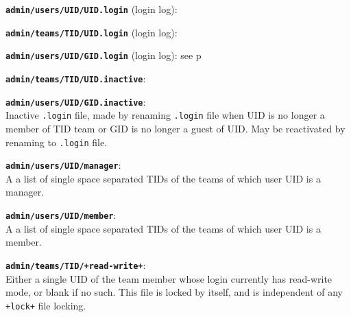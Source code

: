 \documentclass[12pt]{article}
\newenvironment{indpar}[1][0.4in]%
	{\begin{list}{}%
		     {\setlength{\itemsep}{0in}%
		      \setlength{\topsep}{0in}%
		      \setlength{\parsep}{1ex}%
		      \setlength{\labelwidth}{#1}%
		      \setlength{\leftmargin}{#1}%
		      \addtolength{\leftmargin}{\labelsep}}%
	 \item}%
	{\end{list}}
\newenvironment{itemlist}[1][0.2in]%
	{\begin{list}{}{\setlength{\labelwidth}{#1}%
		        \setlength{\leftmargin}{\labelwidth}%
		        \addtolength{\leftmargin}{+0.2in}%
		        \addtolength{\linewidth}{-\labelwidth}%
		        \addtolength{\linewidth}{-0.2in}%
		        \renewcommand{\makelabel}[1]{##1\hfill}}
	 \raggedright}%
	{\end{list}}
\newcommand{\TT}[1]{{\tt \bfseries #1}}
\newcommand{\pagref}[1]{p\pageref{#1}}
\begin{document}
\begin{indpar}
\begin{itemlist}
\item[\TT{admin/users/UID/UID.login} (login log):]
\item[\TT{admin/teams/TID/UID.login} (login log):]\vspace*{-1ex}
\item[\TT{admin/users/UID/GID.login} (login log):]\vspace*{-1ex}
see \pagref{ADMIN/USERS/XID/YID.LOGIN}

\item[\TT{admin/teams/TID/UID.inactive}:]
\item[\TT{admin/users/UID/GID.inactive}:]\vspace*{-1ex} ~
\label{ADMIN/USERS/XID/YID.INACTIVE} \\
Inactive {\tt .login} file, made by renaming {\tt .login} file
when UID is no longer a member of TID team or GID is no longer
a guest of UID.  May be reactivated by renaming to {\tt .login}
file.

\item[\TT{admin/users/UID/manager}:] ~
\label{ADMIN/USERS/UID/MANAGER} \\
A a list of single space separated TIDs of the teams of which
user UID is a manager.

\item[\TT{admin/users/UID/member}:] ~
\label{ADMIN/USERS/UID/MEMBER} \\
A a list of single space separated TIDs of the teams of which
user UID is a member.

\item[\TT{admin/teams/TID/+read-write+}:] ~
\label{ADMIN/TEAMS/TID/READ-WRITE} \\
Either a single UID of the team member whose login currently
has read-write mode, or blank if no such.  This file is locked
by itself, and is independent of any {\tt +lock+} file locking.


\end{itemlist}
\end{indpar}
\end{document}
